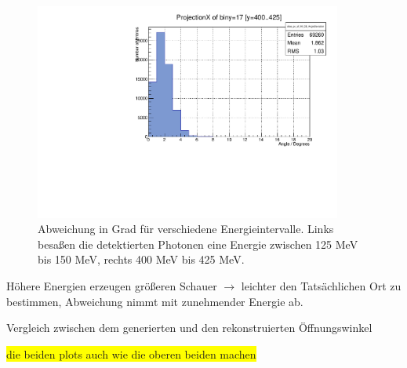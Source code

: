 \documentclass[a4paper,11pt,oneside,final,german,openbib,pdftex]{scrbook}
\begin{document}
{\begin{figure}[h!]
\begin{minipage}{0.45\textwidth}
	\end{minipage}
	\hfill
	\begin{minipage}{0.45\textwidth}
		\centering
		\includegraphics[width=0.9\textwidth]{20171804MCTrueCandidatsAngleDeviation400MeV}
	\end{minipage}
	\caption{Abweichung in Grad f\"ur verschiedene Energieintervalle. Links besa{\ss}en die detektierten Photonen eine Energie zwischen 125 MeV bis 150 MeV, rechts 400 MeV bis 425 MeV.}
	
\end{figure}
H\"ohere Energien erzeugen gr\"o{\ss}eren Schauer $\rightarrow$ leichter den Tats\"achlichen Ort zu bestimmen, Abweichung nimmt mit zunehmender Energie ab.

Vergleich zwischen dem generierten und den rekonstruierten \"Offnungswinkel 

\colorbox{yellow}{die beiden plots auch wie die oberen beiden machen}

}
\end{document}
